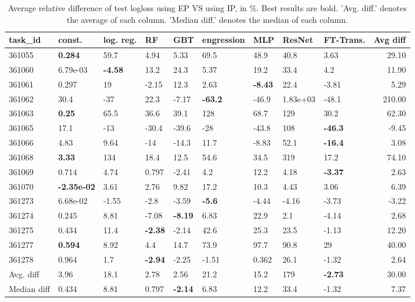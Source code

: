 \begin{table}[ht!]
\centering
\begingroup\footnotesize
\begin{tabular}{lllllllllr}
  \hline
\hline
task\_id & const. & log. reg. & RF & GBT & engression & MLP & ResNet & FT-Trans. & Avg diff \\ 
  \hline
361055 & \textbf{0.284} & 59.7 & 4.94 & 5.33 & 69.5 & 48.9 & 40.8 & 3.63 & 29.10 \\ 
  361060 &  6.79e-03 & \textbf{-4.58} & 13.2 & 24.3 & 5.37 & 19.2 & 33.4 & 4.2 & 11.90 \\ 
  361061 & 0.297 & 19 & -2.15 & 12.3 & 2.63 & \textbf{-8.43} & 22.4 & -3.81 & 5.29 \\ 
  361062 & 30.4 & -37 & 22.3 & -7.17 & \textbf{-63.2} & -46.9 &  1.83e+03 & -48.1 & 210.00 \\ 
  361063 & \textbf{0.25} & 65.5 & 36.6 & 39.1 & 128 & 68.7 & 129 & 30.2 & 62.30 \\ 
  361065 & 17.1 & -13 & -30.4 & -39.6 & -28 & -43.8 & 108 & \textbf{-46.3} & -9.45 \\ 
  361066 & 4.83 & 9.64 & -14 & -14.3 & 11.7 & -8.83 & 52.1 & \textbf{-16.4} & 3.08 \\ 
  361068 & \textbf{3.33} & 134 & 18.4 & 12.5 & 54.6 & 34.5 & 319 & 17.2 & 74.10 \\ 
  361069 & 0.714 & 4.74 & 0.797 & -2.41 & 4.2 & 12.2 & 4.18 & \textbf{-3.37} & 2.63 \\ 
  361070 & \textbf{-2.35e-02} & 3.61 & 2.76 & 9.82 & 17.2 & 10.3 & 4.43 & 3.06 & 6.39 \\ 
  361273 &  6.68e-02 & -1.55 & -2.8 & -3.59 & \textbf{-5.6} & -4.44 & -4.16 & -3.73 & -3.22 \\ 
  361274 & 0.245 & 8.81 & -7.08 & \textbf{-8.19} & 6.83 & 22.9 & 2.1 & -4.14 & 2.68 \\ 
  361275 & 0.434 & 11.4 & \textbf{-2.38} & -2.14 & 42.6 & 25.3 & 23.5 & -1.13 & 12.20 \\ 
  361277 & \textbf{0.594} & 8.92 & 4.4 & 14.7 & 73.9 & 97.7 & 90.8 & 29 & 40.00 \\ 
  361278 & 0.964 & 1.7 & \textbf{-2.94} & -2.25 & -1.51 & 0.362 & 26.1 & -1.32 & 2.64 \\ 
   \hline
Avg. diff & 3.96 & 18.1 & 2.78 & 2.56 & 21.2 & 15.2 & 179 & \textbf{-2.73} & 30.00 \\ 
  Median diff & 0.434 & 8.81 & 0.797 & \textbf{-2.14} & 6.83 & 12.2 & 33.4 & -1.32 & 7.37 \\ 
   \hline
\hline
\end{tabular}
\endgroup
\caption{Average relative difference of test logloss using EP VS using IP, in \%. 
                  Best results are bold. 
                  'Avg. diff.' denotes the average of each column.
                  'Median diff.' denotes the median of each column.} 
\label{TABLES/table_results_mahalanobis_logloss_only_num_features_EP_VS_IP}
\end{table}
